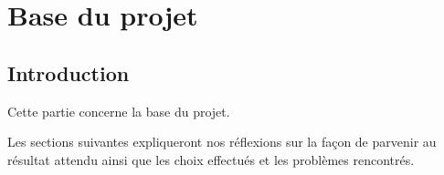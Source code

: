 \section{Base du projet}
\subsection{Introduction}
\begin{flushleft}
Cette partie concerne la base du projet.
\end{flushleft}
\begin{flushleft}
Les sections suivantes expliqueront nos réflexions sur la façon de parvenir au résultat attendu ainsi que les choix effectués et les problèmes rencontrés.
\end{flushleft}

